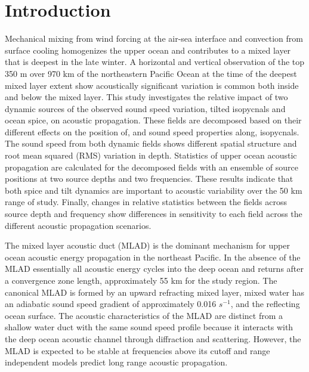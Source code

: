 \documentclass[preprint,NumberedRefs]{JASA}
\begin{document}
\section{\label{sec:intro} Introduction}
Mechanical mixing from wind forcing at the air-sea interface and convection from surface cooling homogenizes the upper ocean and contributes to a mixed layer that is deepest in the late winter\citep{cole2010seasonal}. A horizontal and vertical observation of the top 350 m over 970 km of the northeastern Pacific Ocean at the time of the deepest mixed layer extent show acoustically significant variation is common both inside and below the mixed layer\citep{colosi2020observations}. This study investigates the relative impact of two dynamic sources of the observed sound speed variation, tilted isopycnals and ocean spice, on acoustic propagation. These fields are decomposed based on their different effects on the position of, and sound speed properties along, isopycnals\cite{dzieciuch2004}. The sound speed from both dynamic fields shows different spatial structure and root mean squared (RMS) variation in depth. Statistics of upper ocean acoustic propagation are calculated for the decomposed fields with an ensemble of source positions at two source depths and two frequencies. These results indicate that both spice and tilt dynamics are important to acoustic variability over the 50 km range of study. Finally, changes in relative statistics between the fields across source depth and frequency show differences in sensitivity to each field across the different acoustic propagation scenarios.

The mixed layer acoustic duct (MLAD) is the dominant mechanism for upper ocean acoustic energy propagation in the northeast Pacific. In the absence of the MLAD essentially all acoustic energy cycles into the deep ocean and returns after a convergence zone length\cite{jensen2011computational}, approximately 55 km for the study region. The canonical MLAD is formed by an upward refracting mixed layer, mixed water has an adiabatic sound speed gradient of approximately 0.016 $s^{-1}$, and the reflecting ocean surface. The acoustic characteristics of the MLAD are distinct from a shallow water duct with the same sound speed profile because it interacts with the deep ocean acoustic channel through diffraction\citep{porter93} and scattering\cite{colosi2020observations}. However, the MLAD is expected to be stable at frequencies above its cutoff\citep{Urick1982Prop} and range independent models predict long range acoustic propagation.
\end{document}
